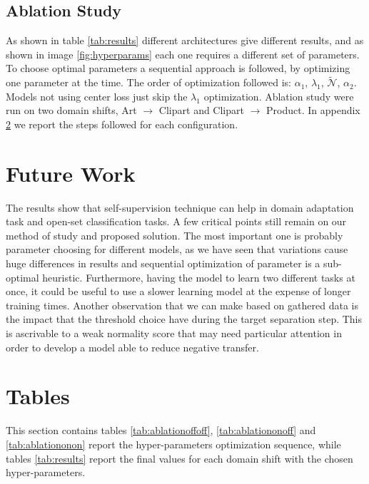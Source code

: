 \documentclass[10pt,twocolumn,letterpaper]{article}
\begin{document}
\subsection{Ablation Study}
\label{sec:ablation_study}
As shown in table \ref{tab:results} different architectures give different results, 
and as shown in image \ref{fig:hyperparams} each one requires a different set of parameters.
To choose optimal parameters a sequential approach is followed, 
by optimizing one parameter at the time.
The order of optimization followed is: 
$\alpha_1$, $\lambda_1$, $\mathcal{\tilde N}$, $\alpha_2$.
Models not using center loss just skip the $\lambda_1$ optimization.
Ablation study were run on two domain shifts, 
Art $\to$ Clipart and Clipart $\to$ Product.
In appendix \ref{sec:tables} we report the steps followed for each configuration.

\section{Future Work}
\label{sec:future_work}

The results show that self-supervision technique can help in domain adaptation task and open-set classification tasks.
A few critical points still remain on our method of study and proposed solution.
The most important one is probably parameter choosing for different models, as we have seen that variations cause huge differences in results and sequential optimization of parameter is a sub-optimal heuristic.
Furthermore, having the model to learn two different tasks at once, it could be useful to use a slower learning model at the expense of longer training times.
Another observation that we can make based 
on gathered data is the impact that the threshold 
choice have during the target separation step.
This is ascrivable to a weak normality score 
that may need particular attention in order to develop
a model able to reduce negative transfer.

{\small
\nocite{BucciROS}


}

\appendix
\section{Tables}
\label{sec:tables}

This section contains tables \ref{tab:ablationoffoff}, \ref{tab:ablationonoff} and \ref{tab:ablationonon} report the hyper-parameters optimization sequence, while tables \ref{tab:results} report the final values for each domain shift with the chosen hyper-parameters.
\end{document}
